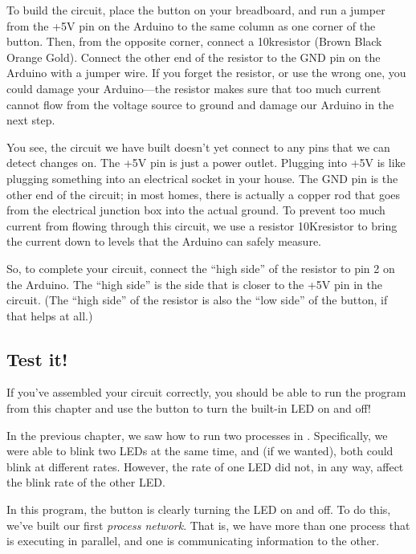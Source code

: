 To build the circuit, place the button on your breadboard, and run a jumper from the {\code +5V} pin on the Arduino to the same column as one corner of the button. Then, from the opposite corner, connect a 10k\ohm resistor (Brown Black Orange Gold). Connect the other end of the resistor to the {\code GND} pin on the Arduino with a jumper wire. If you forget the resistor, or use the wrong one, you could damage your Arduino---the resistor makes sure that too much current cannot flow from the voltage source to ground and damage our Arduino in the next step.

You see, the circuit we have built doesn't yet connect to any pins that we can detect changes on. The {\code +5V} pin is just a power outlet. Plugging into {\code +5V} is like plugging something into an electrical socket in your house. The {\code GND} pin is the other end of the circuit; in most homes, there is actually a copper rod that goes from the electrical junction box into the actual ground. To prevent too much current from flowing through this circuit, we use a resistor 10K\ohm resistor to bring the current down to levels that the Arduino can safely measure.

So, to complete your circuit, connect the ``high side'' of the resistor to pin 2 on the Arduino. The ``high side'' is the side that is closer to the {\code +5V} pin in the circuit. (The ``high side'' of the resistor is also the ``low side'' of the button, if that helps at all.)

\subsection{Test it!}
If you've assembled your circuit correctly, you should be able to run the program from this chapter and use the button to turn the built-in LED on and off!

\PATTERNS
In the previous chapter, we saw how to run two processes in \PARallel. Specifically, we were able to blink two LEDs at the same time, and (if we wanted), both could blink at different rates. However, the rate of one LED did not, in any way, affect the blink rate of the other LED.

In this program, the button is clearly turning the LED on and off. To do this, we've built our first {\em process network}. That is, we have more than one process that is executing in parallel, and one is communicating information to the other.

